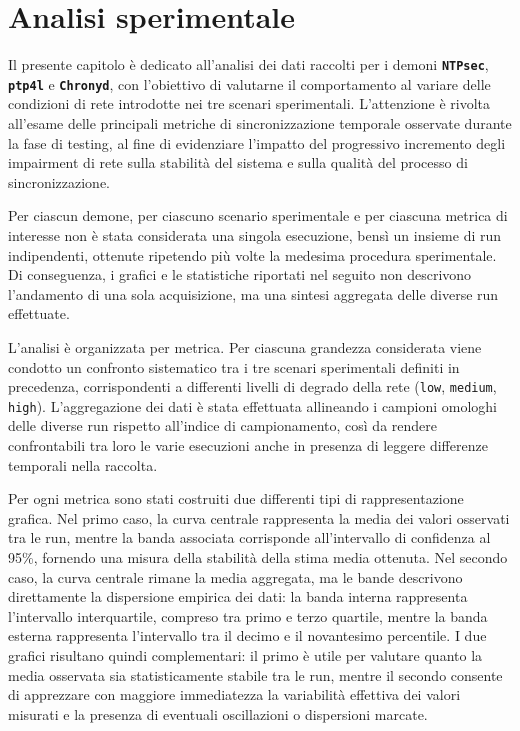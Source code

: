 \chapter{Analisi sperimentale}
\label{cha:AnalisiSperimentale} \label{cha:AnalisiSperimentale}

Il presente capitolo è dedicato all’analisi dei dati raccolti per i demoni
\texttt{\textbf{NTPsec}}, \texttt{\textbf{ptp4l}} e \texttt{\textbf{Chronyd}}, con
l’obiettivo di valutarne il comportamento al variare delle condizioni di rete introdotte
nei tre scenari sperimentali. L’attenzione è rivolta all’esame delle principali
metriche di sincronizzazione temporale osservate durante la fase di testing, al fine
di evidenziare l’impatto del progressivo incremento degli impairment di rete sulla
stabilità del sistema e sulla qualità del processo di sincronizzazione.

Per ciascun demone, per ciascuno scenario sperimentale e per ciascuna metrica di
interesse non è stata considerata una singola esecuzione, bensì un insieme di run
indipendenti, ottenute ripetendo più volte la medesima procedura sperimentale. Di
conseguenza, i grafici e le statistiche riportati nel seguito non descrivono
l’andamento di una sola acquisizione, ma una sintesi aggregata delle diverse run effettuate.

L’analisi è organizzata per metrica. Per ciascuna grandezza considerata viene
condotto un confronto sistematico tra i tre scenari sperimentali definiti in
precedenza, corrispondenti a differenti livelli di degrado della rete (\texttt{low},
\texttt{medium}, \texttt{high}). L’aggregazione dei dati è stata effettuata allineando
i campioni omologhi delle diverse run rispetto all’indice di campionamento, così
da rendere confrontabili tra loro le varie esecuzioni anche in presenza di
leggere differenze temporali nella raccolta.

Per ogni metrica sono stati costruiti due differenti tipi di rappresentazione
grafica. Nel primo caso, la curva centrale rappresenta la media dei valori
osservati tra le run, mentre la banda associata corrisponde all’intervallo di confidenza
al 95\%, fornendo una misura della stabilità della stima media ottenuta. Nel
secondo caso, la curva centrale rimane la media aggregata, ma le bande
descrivono direttamente la dispersione empirica dei dati: la banda interna rappresenta
l’intervallo interquartile, compreso tra primo e terzo quartile, mentre la banda esterna
rappresenta l’intervallo tra il decimo e il novantesimo percentile. I due
grafici risultano quindi complementari: il primo è utile per valutare quanto la media
osservata sia statisticamente stabile tra le run, mentre il secondo consente di
apprezzare con maggiore immediatezza la variabilità effettiva dei valori
misurati e la presenza di eventuali oscillazioni o dispersioni marcate.

